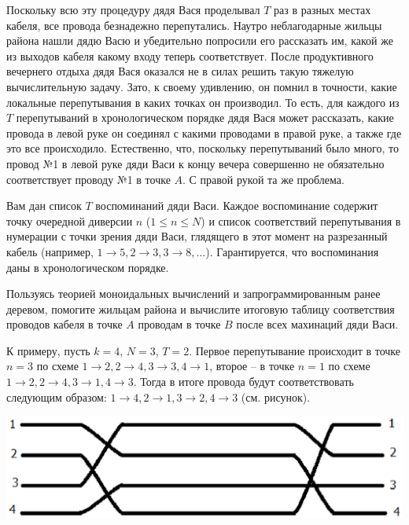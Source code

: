 \documentclass[a4paper,11pt]{article}
\begin{document}
\begin{enumerate}[{3-}1]
\begin{enumerate}
Поскольку всю эту процедуру дядя Вася проделывал $T$ раз в разных местах
кабеля, все провода безнадежно перепутались. Наутро неблагодарные жильцы
района нашли дядю Васю и убедительно попросили его рассказать им, какой же
из выходов кабеля какому входу теперь соответствует. После продуктивного
вечернего отдыха дядя Вася оказался не в силах решить такую тяжелую
вычислительную задачу. Зато, к своему удивлению, он помнил в точности, какие
локальные перепутывания в каких точках он производил. То есть, для каждого из
$T$ перепутываний в хронологическом порядке дядя Вася может рассказать, какие
провода в левой руке он соединял с какими проводами в правой руке, а также где
это все происходило. Естественно, что, поскольку перепутываний было много, то
провод №1 в левой руке дяди Васи к концу вечера совершенно не обязательно
соответствует проводу №1 в точке $A$. С правой рукой та же проблема.

Вам дан список $T$ воспоминаний дяди Васи. Каждое воспоминание содержит точку
очередной диверсии $n$ ($1 \le n \le N$) и список соответствий перепутывания в
нумерации с точки зрения дяди Васи, глядящего в этот момент на разрезанный
кабель (например, $1 \to 5, 2 \to 3, 3 \to 8, \ldots$). Гарантируется, что
воспоминания даны в хронологическом порядке.

Пользуясь теорией моноидальных вычислений и запрограммированным ранее деревом,
помогите жильцам района и вычислите итоговую таблицу соответствия проводов
кабеля в точке $A$ проводам в точке $B$ после всех махинаций дяди Васи.

К примеру, пусть $k=4$, $N=3$, $T=2$. Первое перепутывание происходит в точке
$n=3$ по схеме $1\to2,2\to4,3\to3,4\to1$, второе -- в точке $n=1$ по схеме
$1\to2,2\to4,3\to1,4\to3$. Тогда в итоге провода будут соответствовать 
следующим образом: $1\to4,2\to1,3\to2,4\to3$ (см. рисунок).
\begin{center}
\includegraphics[scale=0.6]{problems2/wires.eps}
\end{center}
\end{enumerate}
\end{enumerate}
\end{document}
